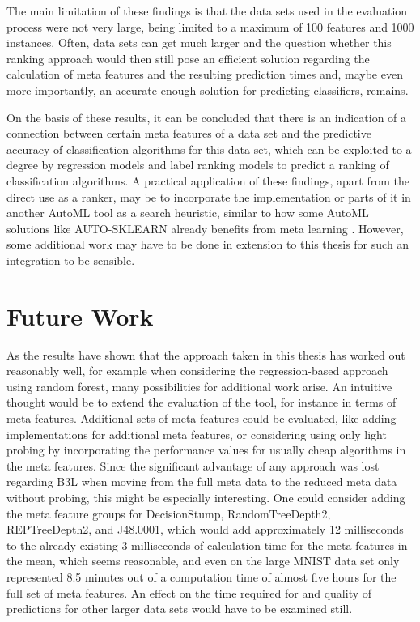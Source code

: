 The main limitation of these findings is that the data sets used in the evaluation process were not very large, being limited to a maximum of 100 features and 1000 instances. Often, data sets can get much larger and the question whether this ranking approach would then still pose an efficient solution regarding the calculation of meta features and the resulting prediction times and, maybe even more importantly, an accurate enough solution for predicting classifiers, remains. 

On the basis of these results, it can be concluded that there is an indication of a connection between certain meta features of a data set and the predictive accuracy of classification algorithms for this data set, which can be exploited to a degree by regression models and label ranking models to predict a ranking of classification algorithms. A practical application of these findings, apart from the direct use as a ranker, may be to incorporate the implementation or parts of it in another AutoML tool as a search heuristic, similar to how some AutoML solutions like AUTO-SKLEARN already benefits from meta learning \cite{feurer2015efficient}. However, some additional work may have to be done in extension to this thesis for such an integration to be sensible.

\section{Future Work}
\label{sec:conclusion:future}
As the results have shown that the approach taken in this thesis has worked out reasonably well, for example when considering the regression-based approach using random forest, many possibilities for additional work arise. An intuitive thought would be to extend the evaluation of the tool, for instance in terms of meta features. Additional sets of meta features could be evaluated, like adding implementations for additional meta features, or considering using only light probing by incorporating the performance values for usually cheap algorithms in the meta features. Since the significant advantage of any approach was lost regarding B3L when moving from the full meta data to the reduced meta data without probing, this might be especially interesting. One could consider adding the meta feature groups for DecisionStump, RandomTreeDepth2, REPTreeDepth2, and J48.0001, which would add approximately 12 milliseconds to the already existing 3 milliseconds of calculation time for the meta features in the mean, which seems reasonable, and even on the large MNIST data set only represented 8.5 minutes out of a computation time of almost five hours for the full set of meta features. An effect on the time required for and quality of predictions for other larger data sets would have to be examined still.

